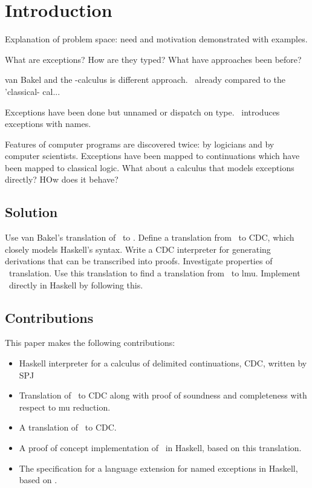 \chapter{Introduction}

Explanation of problem space: need and motivation demonstrated with examples.

What are exceptions? How are they typed? What have approaches been before?

van Bakel and the \ltry-calculus is different approach. \ltry\ already compared
to the 'classical- cal...

Exceptions have been done but unnamed or dispatch on type.
\ltry\ introduces exceptions with names.

Features of computer programs are discovered twice: by logicians and by computer scientists.\cite{Wadler15}
Exceptions have been mapped to continuations which have been mapped to classical logic.
What about a calculus that models exceptions directly?
HOw does it behave?

\section{Solution}
Use van Bakel's translation of \ltry\ to \lmu.
Define a translation from \lmu\ to CDC, which closely models Haskell's syntax.
Write a CDC interpreter for generating derivations that can be transcribed into proofs.
Investigate properties of \lmu\ translation.
Use this translation to find a translation from \ltry\ to lmu.
Implement \ltry\ directly in Haskell by following this.

\section{Contributions}
This paper makes the following contributions:
\begin{itemize}
\item Haskell interpreter for a calculus of delimited continuations, CDC, written by SPJ
\item Translation of \lmu\ to CDC along with proof of soundness and completeness with respect to mu reduction.
\item A translation of \ltry\ to CDC.
\item A proof of concept implementation of \ltry\ in Haskell, based on this translation.
\item The specification for a language extension for named exceptions in Haskell, based on \ltry.
\end{itemize}
